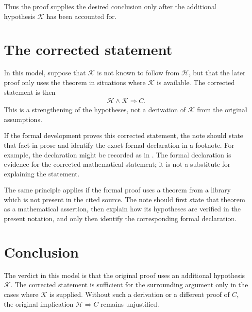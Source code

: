 \documentclass[11pt]{article}
\begin{document}
Thus the proof supplies the desired conclusion only after the additional
hypothesis \(\mathcal K\) has been accounted for.

\section{The corrected statement}

In this model, suppose that \(\mathcal K\) is not known to follow from
\(\mathcal H\), but that the later proof only uses the theorem in situations
where \(\mathcal K\) is available.  The corrected statement is then
\begin{align}
  \mathcal H \wedge \mathcal K \Longrightarrow C.
\end{align}
This is a strengthening of the hypotheses, not a derivation of \(\mathcal K\)
from the original assumptions.

If the formal development proves this corrected statement, the note should state
that fact in prose and identify the exact formal declaration in a footnote.  For
example, the declaration might be recorded as  in
.  The formal declaration is evidence for the
corrected mathematical statement; it is not a substitute for explaining the
statement.

The same principle applies if the formal proof uses a theorem from a library
which is not present in the cited source.  The note should first state that
theorem as a mathematical assertion, then explain how its hypotheses are verified
in the present notation, and only then identify the corresponding formal
declaration.

\section{Conclusion}

The verdict in this model is that the original proof uses an additional
hypothesis \(\mathcal K\).  The corrected statement is sufficient for the
surrounding argument only in the cases where \(\mathcal K\) is supplied.  Without
such a derivation or a different proof of \(C\), the original implication
\(\mathcal H\Rightarrow C\) remains unjustified.



\end{document}
